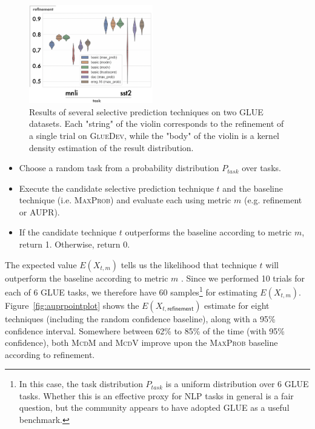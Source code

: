 \documentclass[11pt]{article}
\begin{document}
\begin{figure}
\centering
\includegraphics[width=0.48\textwidth]{violinplot2.png}
\caption{Results of several selective prediction techniques on two \textsc{GLUE} datasets. Each "string" of the violin corresponds to the refinement of a single trial on \textsc{GlueDev}, while the "body" of the violin is a kernel density estimation of the result distribution.}
\label{fig:posthocviolin}
\end{figure}


\begin{itemize}
\item Choose a random task from a probability distribution $P_{task}$ over tasks.
\item Execute the candidate selective prediction technique $t$ and the baseline technique (i.e. \textsc{MaxProb}) and evaluate each using metric $m$ (e.g. refinement or \textsc{AUPR}).
\item If the candidate technique $t$ outperforms the baseline according to metric $m$, return 1. Otherwise, return 0.
\end{itemize}


\noindent The expected value $E(X_{t,m})$ tells us the likelihood that technique $t$ will outperform the baseline according to metric $m$ . Since we performed 10 trials for each of 6 GLUE tasks, we therefore have 60 samples\footnote{In this case, the task distribution $P_{task}$ is a uniform distribution over 6 GLUE tasks. Whether this is an effective proxy for NLP tasks in general is a fair question, but the community appears to have adopted GLUE as a useful benchmark.} for estimating $E(X_{t,m})$. Figure~\ref{fig:auprpointplot} shows the $E(X_{t,\mathsf{refinement}})$ estimate for eight techniques (including the random confidence baseline), along with a 95\% confidence interval. Somewhere between 62\% to 85\% of the time (with 95\% confidence), both \textsc{McdM} and \textsc{McdV} improve upon the \textsc{MaxProb} baseline according to refinement.  
\end{document}
